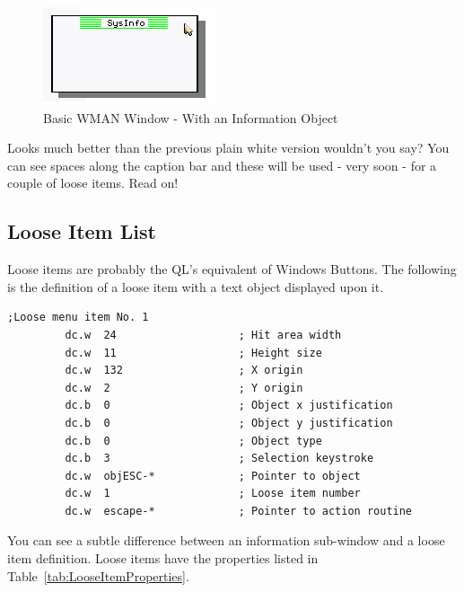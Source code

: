 \begin{figure}[h]
\center
\includegraphics{Content/images/SystemInfo_3.png}
\caption{Basic WMAN Window - With an Information Object}
\label{fig:FirstWindowInAction3}
\end{figure}


Looks much better than the previous plain white version wouldn't you say? You can
see spaces along the caption bar and these will be used -{} very soon -{} for a couple of
loose items. Read on!

\subsection{Loose Item List}
\label{ch23-loose-items}%

Loose items are probably the QL's equivalent of Windows Buttons. The following is
the definition of a loose item with a text object displayed upon it.

\begin{lstlisting}[firstnumber=last,caption={WMAN Example Window - Loose Item 0}]
;Loose menu item No. 1
         dc.w  24                   ; Hit area width
         dc.w  11                   ; Height size
         dc.w  132                  ; X origin
         dc.w  2                    ; Y origin
         dc.b  0                    ; Object x justification 
         dc.b  0                    ; Object y justification 
         dc.b  0                    ; Object type
         dc.b  3                    ; Selection keystroke
         dc.w  objESC-*             ; Pointer to object
         dc.w  1                    ; Loose item number
         dc.w  escape-*             ; Pointer to action routine
\end{lstlisting}

You can see a subtle difference between an information sub-{}window and a loose item
definition. Loose items have the properties listed in Table~\ref{tab:LooseItemProperties}.


